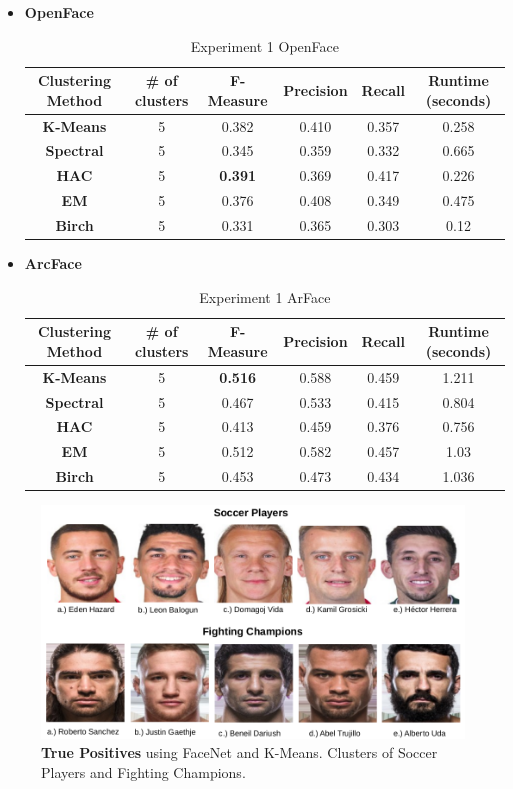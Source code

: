 \documentclass[12pt,english]{article}
\begin{document}
\begin{itemize}
\item \textbf{OpenFace}
\begin{table}[H]
\centering
\begin{tabular}{||c c c c c c||} 
 \hline
 Clustering Method & \# of clusters & F-Measure & Precision & Recall & Runtime (seconds)\\ [0.5ex]
 \hline\hline
 \textbf{K-Means} & 5 & 0.382 & 0.410 & 0.357 & 0.258\\ 
 \hline
  \textbf{Spectral} & 5 & 0.345 & 0.359 & 0.332 & 0.665\\
 \hline
 \textbf{HAC} & 5 & \textbf{0.391} & 0.369 & 0.417 & 0.226\\
 \hline
 \textbf{EM} & 5 & 0.376 & 0.408 & 0.349 & 0.475\\
 \hline
 \textbf{Birch} & 5 & 0.331 & 0.365 & 0.303 & 0.12\\
 \hline
\end{tabular}
\caption{Experiment 1 OpenFace}
\label{table:ex1openface}
\end{table}

\newpage

\item \textbf{ArcFace}
\begin{table}[H]
\centering
\begin{tabular}{||c c c c c c||} 
 \hline
 Clustering Method & \# of clusters & F-Measure & Precision & Recall & Runtime (seconds)\\ [0.5ex]
 \hline\hline
 \textbf{K-Means} & 5 & \textbf{0.516} & 0.588 & 0.459 & 1.211\\ 
 \hline
  \textbf{Spectral} & 5 & 0.467 & 0.533 & 0.415 & 0.804\\
 \hline
 \textbf{HAC} & 5 & 0.413 & 0.459 & 0.376 & 0.756\\
 \hline
 \textbf{EM} & 5 & 0.512 & 0.582 & 0.457 & 1.03\\
 \hline
 \textbf{Birch} & 5 & 0.453 & 0.473 & 0.434 & 1.036\\
 \hline
\end{tabular}
\caption{Experiment 1 ArFace}
\label{table:ex1arcface}
\end{table}

\end{itemize}


\begin{figure}[H]
 \centering
    \includegraphics[width=0.9\columnwidth]{figures/soccer_tp.png}
    \caption{\textbf{True Positives} using FaceNet and K-Means. Clusters of Soccer Players and Fighting Champions.}
    \label{fig:ex1tp}
\end{figure}
\end{document}
